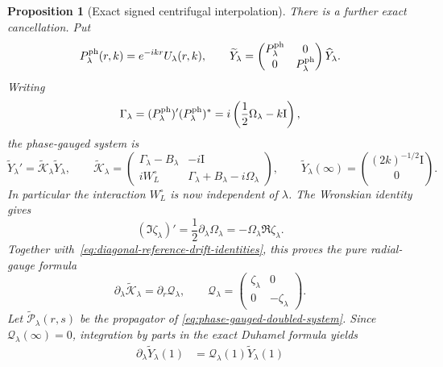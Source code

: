 \documentclass[11pt]{article}
\newcommand{\Id}{\mathrm I}
\newtheorem{proposition}[theorem]{Proposition}
\theoremstyle{definition}
\theoremstyle{remark}
\begin{document}
\begin{proposition}[Exact signed centrifugal interpolation]
There is a further exact cancellation.  Put
\begin{equation}
 P_\lambda^{\rm ph}(r,k)=e^{-ikr}U_\lambda(r,k),
 \qquad
 \widetilde Y_\lambda
 =\begin{pmatrix}P_\lambda^{\rm ph}&0\\0&P_\lambda^{\rm ph}\end{pmatrix}
  \widehat Y_\lambda.
 \label{eq:outgoing-phase-gauge}
\end{equation}
Writing
\begin{equation}
 \Gamma_\lambda
 =(P_\lambda^{\rm ph})'(P_\lambda^{\rm ph})^*
 =i\left(\frac12\Omega_\lambda-k\Id\right),
 \label{eq:phase-gauge-connection}
\end{equation}
the phase-gauged system is
\begin{equation}
 \widetilde Y_\lambda'
 =\widetilde{\mathcal K}_\lambda\widetilde Y_\lambda,
 \qquad
 \widetilde{\mathcal K}_\lambda=
 \begin{pmatrix}
  \Gamma_\lambda-B_\lambda&-i\Id\\
  iW_L^\circ&\Gamma_\lambda+B_\lambda-i\Omega_\lambda
 \end{pmatrix},
 \qquad
 \widetilde Y_\lambda(\infty)
 =\binom{(2k)^{-1/2}\Id}{0}.
 \label{eq:phase-gauged-doubled-system}
\end{equation}
In particular the interaction $W_L^\circ$ is now independent of $\lambda$.
The Wronskian identity gives
\begin{equation}
 (\Im\zeta_\lambda)'
 =\frac12\partial_\lambda\Omega_\lambda
 =-\Omega_\lambda\Re\zeta_\lambda.
 \label{eq:phase-amplitude-wronskian-identity}
\end{equation}
Together with~\eqref{eq:diagonal-reference-drift-identities}, this proves the
pure radial-gauge formula
\begin{equation}
 \boxed{
 \partial_\lambda\widetilde{\mathcal K}_\lambda
 =\partial_r\mathcal Q_\lambda,
 \qquad
 \mathcal Q_\lambda
 =\begin{pmatrix}\zeta_\lambda&0\\0&-\zeta_\lambda\end{pmatrix}.}
 \label{eq:pure-radial-gauge-variation}
\end{equation}
Let $\widetilde{\mathcal P}_\lambda(r,s)$ be the propagator of
\eqref{eq:phase-gauged-doubled-system}.  Since
$\mathcal Q_\lambda(\infty)=0$, integration by parts in the exact Duhamel
formula yields
\begin{align}
 \partial_\lambda\widetilde Y_\lambda(1)
 &=\mathcal Q_\lambda(1)\widetilde Y_\lambda(1)

\end{align}
\end{proposition}
\end{document}
